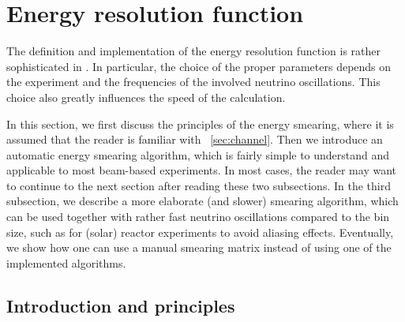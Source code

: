 \section{Energy resolution function}
\label{sec:energy}

The definition and implementation of the energy resolution function is 
rather sophisticated in \GLOBES . In particular, the choice of the 
proper parameters depends on the experiment and the frequencies of the
 involved neutrino oscillations. This choice also greatly influences the
speed of the calculation.

In this section, we first discuss the principles of the energy smearing, where it is assumed that the reader is familiar with \Sec~\ref{sec:channel}. Then we introduce an automatic energy smearing algorithm, which is fairly simple to understand and applicable to most beam-based experiments. 
In most cases, the reader may want to continue to the next section after reading these two subsections. In the third subsection, we describe a more elaborate (and slower) smearing algorithm, which can be used together with rather fast neutrino oscillations compared to the bin size, such as for
(solar) reactor experiments to avoid aliasing effects. Eventually, we show how one can use a manual smearing matrix instead of using one of the implemented algorithms.

\subsection{Introduction and principles}


